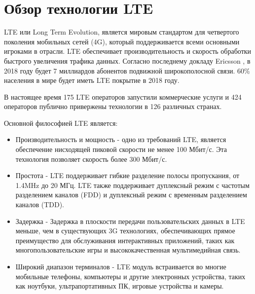\section{Обзор технологии LTE} \label{sect1_2}

LTE или Long Term Evolution, является мировым стандартом для четвертого поколения мобильных сетей (4G), который поддерживается всеми основными игроками в отрасли. LTE обеспечивает производительность и скорость обработки быстрого увеличения трафика данных. Согласно последнему докладу Ericsson \cite{ericsson}, в 2018 году будет 7 миллиардов абонентов подвижной широкополосной связи. 60\% населения в мире будет иметь LTE покрытие в 2018 году.

В настоящее время 175 LTE операторов запустили коммерческие услуги и 424 операторов публично привержены технологии в 126 различных странах.

Основной философией LTE является:
\begin{itemize}
\item Производительность и мощность - одно из требований LTE, является обеспечение нисходящей пиковой скорости не менее 100 Мбит/с. Эта технология позволяет скорость более 300 Мбит/с.

\item Простота - LTE поддерживает гибкие разделение полосы пропускания, от 1.4MHz до 20 МГц. LTE также поддерживает дуплексный режим с частотым разделением каналов (FDD) и дуплексный режим с временным разделением каналов (TDD).

\item Задержка - Задержка в плоскости передачи пользовательских данных в LTE меньше, чем в существующих 3G технологиях, обеспечивающих прямое преимущество для обслуживания интерактивных приложений, таких как многопользовательские игры и высококачественная мультимедийная связь.

\item Широкий диапазон терминалов - LTE модуль встраивается во многие мобильные телефоны, компьютеры и другие электронных устройства, таких как ноутбуки, ультрапортативных ПК, игровые устройства и камеры.
\end{itemize}

